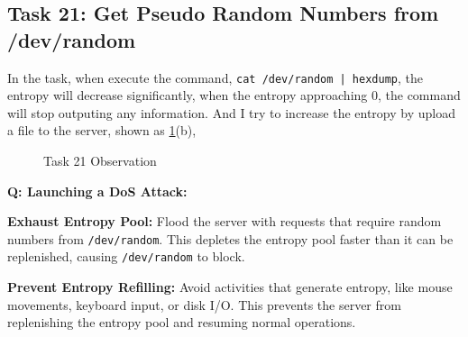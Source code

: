 \documentclass[a4paper,11pt]{article}
\begin{document}
\subsection{Task 21: Get Pseudo Random Numbers from /dev/random}
In the task, when execute the command, \verb!cat /dev/random | hexdump!, the entropy will decrease significantly, when the entropy approaching 0, the command will stop outputing any information. 
And I try to increase the entropy by upload a file to the server, shown as \ref{fig:task21}(b),
\begin{figure}[h]
    \centering
    \hfill
    \hfill
    \caption{Task 21 Observation}\label{fig:task21}
\end{figure}

\textbf{Q: Launching a DoS Attack:}

\textbf{Exhaust Entropy Pool:}
Flood the server with requests that require random numbers from \verb|/dev/random|.
This depletes the entropy pool faster than it can be replenished, causing \verb|/dev/random| to block.

\textbf{Prevent Entropy Refilling:}
Avoid activities that generate entropy, like mouse movements, keyboard input, or disk I/O.
This prevents the server from replenishing the entropy pool and resuming normal operations.
\end{document}
